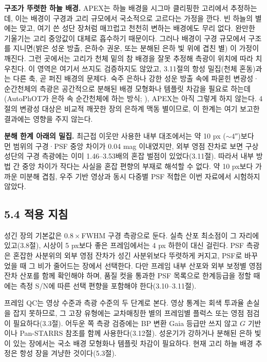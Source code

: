 \textbf{구조가 뚜렷한 하늘 배경.} APEX는 하늘 배경을 시그마 클리핑한 고리에서 추정하는데, 이는 배경이 구경과 고리 규모에서 국소적으로 고르다는 가정을 깐다. 빈 하늘의 별에는 맞고, 여기 쓴 성단 장처럼 매끄럽고 천천히 변하는 배경에도 무리 없다. 완만한 기울기는 고리 중앙값이 대체로 흡수하기 때문이다. 그러나 배경이 구경 규모에서 구조를 지니면(밝은 성운 방출, 은하수 권운, 또는 분해된 은하 빛 위에 겹친 별) 이 가정이 깨진다. 그런 곳에서는 고리가 천체 밑의 참 배경을 잘못 추정해 측광이 위치에 따라 치우친다. 이 영역은 여기서 쓰지도 검증하지도 않았고, 3.11절의 항성 밀집(천체 혼동)과는 다른 축, 곧 퍼진 배경의 문제다. 숙주 은하나 강한 성운 방출 속에 파묻힌 변광성·순간천체의 측광은 공간적으로 분해된 배경 모형화나 템플릿 차감을 필요로 하는데(AutoPhOT가 은하 속 순간천체에 하는 방식; \citealt{brennan2022}), APEX는 아직 그렇게 하지 않는다. 4절의 변광성 대상은 비교적 깨끗한 장의 은하계 맥동 별이므로, 이 한계는 여기 보고한 결과에는 영향을 주지 않는다.



\textbf{분해 한계 아래의 밀집.} 최근접 이웃만 사용한 내부 대조에서는 약 10 px ($\sim4$″)보다 먼 범위의 구경·PSF 중앙 차이가 0.04 mag 이내였지만, 외부 영점 잔차로 보면 구상성단의 구경 측광에는 이미 1.46–3.53배의 혼잡 벌점이 있었다(3.11절). 따라서 내부 방법 간 중앙 차이가 작다는 사실을 혼잡 편향의 부재로 해석할 수 없다. 약 10 px보다 가까운 미분해 겹침, 우주 기반 영상과 동시 다중별 PSF 적합은 이번 자료에서 시험하지 않았다.



\subsection{5.4 적용 지침}

성긴 장의 기본값은 $0.8\times$FWHM 구경 측광으로 둔다. 실측 산포 최소점이 그 자리에 있고(3.8절), 시상이 5 px보다 좋은 프레임에서는 4 px 하한이 대신 걸린다. PSF 측광은 혼잡한 사분위의 외부 영점 잔차가 성긴 사분위보다 뚜렷하게 커지고, PSF로 바꾸었을 때 그 비가 줄어드는 장에서 선택한다. 다만 프레임 내부 산포와 외부 보정별 영점 잔차 산포를 함께 확인해야 하며, 품질 컷을 통과한 PSF 목록으로 한계등급을 정할 때에는 측정 S/N에 따른 선택 편향을 포함해야 한다(3.10–3.11절).



프레임 QC는 영상 수준과 측광 수준의 두 단계로 본다. 영상 통계는 회색 투과율 손실을 잡지 못하므로, 그 고장 유형에는 교차매칭한 별의 프레임별 플럭스 또는 영점 점검이 필요하다(3.3절). 어두운 쪽 측광 검증에는 BP 변환 Gaia 등급만 쓰지 않고 $G$ 기반이나 Pan-STARRS 참조를 함께 사용한다(3.12절). 성운기가 강하거나 분해된 은하 빛이 있는 장에서는 국소 배경 모형화나 템플릿 차감이 필요하다. 현재 고리 하늘 배경 추정은 항성 장을 겨냥한 것이다(5.3절).



